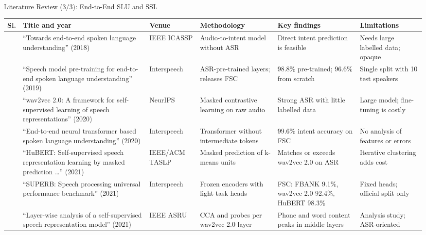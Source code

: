 \documentclass[aspectratio=169,10pt,xcolor=table]{beamer}
\newcommand{\lrfont}{\fontsize{7.0}{8.1}\selectfont}
\newcommand{\lrhead}{\rowcolor{hdrEdge}\textbf{Sl.} & \textbf{Title and year} & \textbf{Venue} & \textbf{Methodology} & \textbf{Key findings} & \textbf{Limitations}\\ \midrule}
\begin{document}
\begin{frame}{Literature Review (3/3): End-to-End SLU and SSL}
\lrfont
\begin{tabularx}{\linewidth}{@{}c L{3.75cm} L{1.4cm} Y Y Y@{}}
\toprule
\lrhead
\cite{serdyuk2018e2eslu} & ``Towards end-to-end spoken language understanding'' (2018) & IEEE ICASSP & Audio-to-intent model without ASR & Direct intent prediction is feasible & Needs large labelled data; opaque\\
\cite{lugosch2019fsc} & ``Speech model pre-training for end-to-end spoken language understanding'' (2019) & Interspeech & ASR-pre-trained layers; releases FSC & 98.8\% pre-trained; 96.6\% from scratch & Single split with 10 test speakers\\
\cite{baevski2020wav2vec2} & ``wav2vec 2.0: A framework for self-supervised learning of speech representations'' (2020) & NeurIPS & Masked contrastive learning on raw audio & Strong ASR with little labelled data & Large model; fine-tuning is costly\\
\cite{radfar2020transformer} & ``End-to-end neural transformer based spoken language understanding'' (2020) & Interspeech & Transformer without intermediate tokens & 99.6\% intent accuracy on FSC & No analysis of features or errors\\
\cite{hsu2021hubert} & ``HuBERT: Self-supervised speech representation learning by masked prediction \ldots'' (2021) & IEEE/ACM TASLP & Masked prediction of k-means units & Matches or exceeds wav2vec 2.0 on ASR & Iterative clustering adds cost\\
\cite{yang2021superb} & ``SUPERB: Speech processing universal performance benchmark'' (2021) & Interspeech & Frozen encoders with light task heads & FSC: FBANK 9.1\%, wav2vec 2.0 92.4\%, HuBERT 98.3\% & Fixed heads; official split only\\
\cite{pasad2021layerwise} & ``Layer-wise analysis of a self-supervised speech representation model'' (2021) & IEEE ASRU & CCA and probes per wav2vec 2.0 layer & Phone and word content peaks in middle layers & Analysis study; ASR-oriented\\
\bottomrule
\end{tabularx}
\end{frame}
\end{document}
